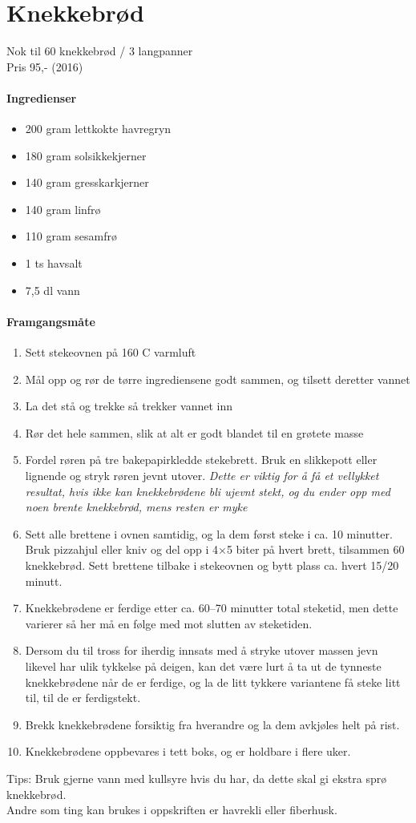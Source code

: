\section{﻿Knekkebrød}
Nok til 60 knekkebrød / 3 langpanner\\
Pris 95,- (2016)

\paragraph{Ingredienser}
\begin{itemize}[noitemsep]
	\item 200 gram lettkokte havregryn
	\item 180 gram solsikkekjerner
	\item 140 gram gresskarkjerner
	\item 140 gram linfrø
	\item 110 gram sesamfrø
	\item 1 ts havsalt
	\item 7,5 dl vann
\end{itemize}

\paragraph{Framgangsmåte}
\begin{enumerate}[noitemsep]
	\item Sett stekeovnen på 160 \degree C varmluft
	\item Mål opp og rør de tørre ingrediensene godt sammen, og tilsett deretter vannet
	\item La det stå og trekke så trekker vannet inn
	\item Rør det hele sammen, slik at alt er godt blandet til en grøtete masse
	\item Fordel røren på tre bakepapirkledde stekebrett. Bruk en slikkepott eller lignende og stryk røren jevnt utover. \emph{Dette er viktig for å få et vellykket resultat, hvis ikke kan knekkebrødene bli ujevnt stekt, og du ender opp med noen brente knekkebrød, mens resten er myke}
	\item Sett alle brettene i ovnen samtidig, og la dem først steke i ca. 10 minutter. Bruk pizzahjul eller kniv og del opp i 4×5 biter på hvert brett, tilsammen 60 knekkebrød. Sett brettene tilbake i stekeovnen og bytt plass ca. hvert 15/20 minutt.
	\item Knekkebrødene er ferdige etter ca. 60--70 minutter total steketid, men dette varierer så her må en følge med mot slutten av steketiden.
	\item Dersom du til tross for iherdig innsats med å stryke utover massen jevn likevel har ulik tykkelse på deigen, kan det være lurt å ta ut de tynneste knekkebrødene når de er ferdige, og la de litt tykkere variantene få steke litt til, til de er ferdigstekt.
	\item Brekk knekkebrødene forsiktig fra hverandre og la dem avkjøles helt på rist.
	\item Knekkebrødene oppbevares i tett boks, og er holdbare i flere uker.
\end{enumerate}



Tips: Bruk gjerne vann med kullsyre hvis du har, da dette skal gi ekstra sprø knekkebrød. \\ Andre som ting kan brukes i oppskriften er havrekli eller fiberhusk.
